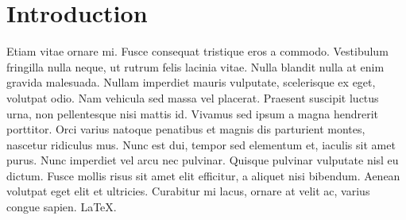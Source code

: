 \section{Introduction}
Etiam vitae ornare mi. Fusce consequat tristique eros a commodo. Vestibulum fringilla nulla neque, ut rutrum felis lacinia vitae. Nulla blandit nulla at enim gravida malesuada. Nullam imperdiet mauris vulputate, scelerisque ex eget, volutpat odio. Nam vehicula sed massa vel placerat. Praesent suscipit luctus urna, non pellentesque nisi mattis id. Vivamus sed ipsum a magna hendrerit porttitor. Orci varius natoque penatibus et magnis dis parturient montes, nascetur ridiculus mus. Nunc est dui, tempor sed elementum et, iaculis sit amet purus. Nunc imperdiet vel arcu nec pulvinar. Quisque pulvinar vulputate nisl eu dictum. Fusce mollis risus sit amet elit efficitur, a aliquet nisi bibendum. Aenean volutpat eget elit et ultricies. Curabitur mi lacus, ornare at velit ac, varius congue sapien. \LaTeX.
